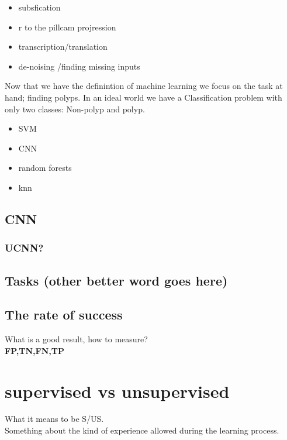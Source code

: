 \documentclass[a4paper,english]{ifimaster}
\begin{document}
	  
	  \begin{itemize}
	    \item subsfication
	    \item r to the pillcam projression 
	    \item transcription/translation
	    \item de-noising /finding missing inputs
	  \end{itemize}
	  
	  Now that we have the definintion of machine learning we focus on the task at hand; finding polyps. In an ideal world we have a
	  Classification problem with only two classes: Non-polyp and polyp. 
	  
	  \begin{itemize}
	    \item SVM 
	    \item CNN 
	    \item random forests
	    \item knn
	  \end{itemize}
	  
	  \subsection{CNN}
	  \subsubsection{UCNN?}
	  
	  
	  
	  
	  
	
	
	
	
	  \subsection{Tasks (other better word goes here)}
\label{chap:Tasks}

\subsection{The rate of success}
What is a good result, how to measure?\\
\textbf{FP,TN,FN,TP}\\


\section{supervised vs unsupervised}
What it means to be S/US.\\
Something about the kind of experience allowed during the learning process.
\end{document}
